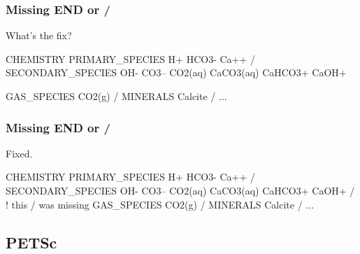 \documentclass{beamer}
\newcommand\redcomment[1]{{{\color{red} #1}}}
\newcommand\bluecomment[1]{{{\color{blue} #1}}}
\newcommand\greencomment[1]{{{\color{green} #1}}}
\newcommand\magentacomment[1]{{{\color{magenta} #1}}}
\begin{document}
\begin{frame}\frametitle{Missing \greencomment{END} or \greencomment{/}}
\redcomment{What's the fix?}
\begin{semiverbatim}
CHEMISTRY
  PRIMARY_SPECIES
    H+
    HCO3-
    Ca++
  /
  SECONDARY_SPECIES
    OH-
    CO3--
    CO2(aq)
    CaCO3(aq)
    CaHCO3+
    CaOH+

  GAS_SPECIES
    CO2(g)
  /
  MINERALS
    Calcite
  /
...
\end{semiverbatim}

\end{frame}

\begin{frame}\frametitle{Missing \greencomment{END} or \greencomment{/}}
\redcomment{Fixed.}
\begin{semiverbatim}
CHEMISTRY
  PRIMARY_SPECIES
    H+
    HCO3-
    Ca++
  /
  SECONDARY_SPECIES
    OH-
    CO3--
    CO2(aq)
    CaCO3(aq)
    CaHCO3+
    CaOH+
  \magentacomment{/} \bluecomment{! this \greencomment{/} was missing}
  GAS_SPECIES
    CO2(g)
  /
  MINERALS
    Calcite
  /
...
\end{semiverbatim}

\end{frame}

\subsection{PETSc}
\end{document}
